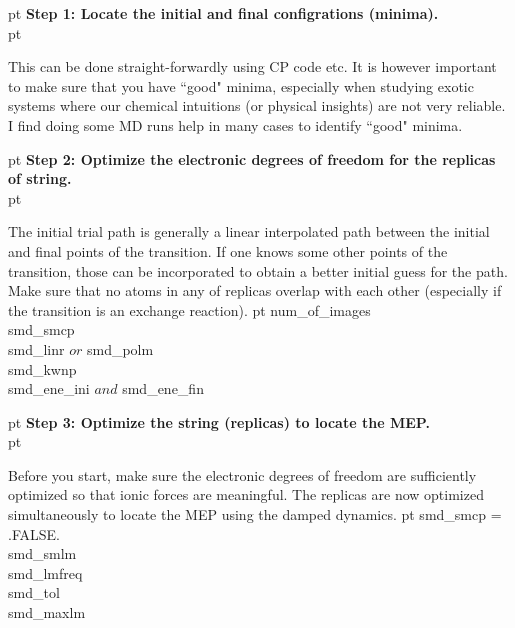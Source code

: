 \documentclass[aps,prb,preprint,groupedaddress]{revtex4}
\begin{document}
 pt
\noindent
{\bf Step 1: Locate the initial and final configrations (minima).} \\
 pt
\begin{minipage}{6in}
This can be done straight-forwardly using CP code etc.
It is however important to make sure that you have ``good" minima, especially
when studying exotic systems where our chemical intuitions (or physical insights)
are not very reliable. I find doing some MD runs help in many cases to identify
``good" minima.
\end{minipage}

 pt
\noindent
{\bf Step 2: Optimize the electronic degrees of freedom for the replicas of string.} \\
 pt
\begin{minipage}{6in}
The initial trial path is generally a linear interpolated path between the 
initial and final points of the transition. If one knows some other points of the
transition, those can be incorporated to obtain a better initial guess for the path.
Make sure that no atoms in any of replicas overlap with each other (especially if 
the transition is an exchange reaction).  
 pt
num\_of\_images \\
smd\_smcp  \\
smd\_linr $or$ smd\_polm \\
smd\_kwnp \\
smd\_ene\_ini $and$ smd\_ene\_fin \\
\end{minipage}

 pt
\noindent
{\bf Step 3: Optimize the string (replicas) to locate the MEP. } \\
 pt
\begin{minipage}{6in}
Before you start, make sure the electronic degrees of freedom are sufficiently
optimized so that ionic forces are meaningful. 
The replicas are now optimized simultaneously to locate the MEP using the
damped dynamics.
 pt
smd\_smcp = .FALSE. \\
smd\_smlm \\
smd\_lmfreq \\
smd\_tol \\
smd\_maxlm \\ 
\end{minipage}
\end{document}
